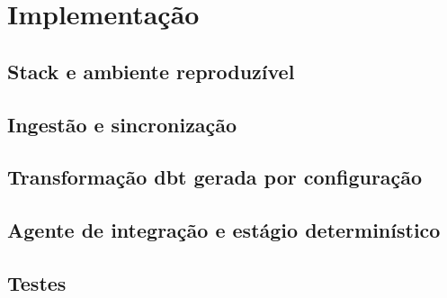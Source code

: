\chapter{Implementação}
\label{chap:implementacao}


\section{Stack e ambiente reproduzível}
\label{sec:implementacao-stack-e-ambiente-reproduzivel}

\section{Ingestão e sincronização}
\label{sec:implementacao-ingestao-e-sincronizacao}

\section{Transformação dbt gerada por configuração}
\label{sec:implementacao-transformacao-dbt-gerada-por-configuracao}

\section{Agente de integração e estágio determinístico}
\label{sec:implementacao-agente-de-integracao-e-estagio-deterministico}

\section{Testes}
\label{sec:implementacao-testes}
